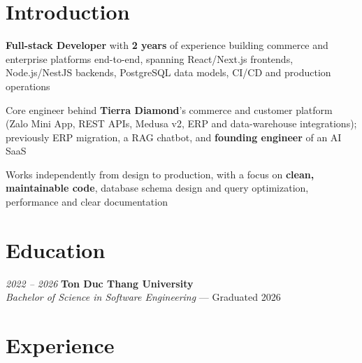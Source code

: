 \section{Introduction}
\begin{onecolentry}
    \begin{highlights}
        \item \textbf{Full-stack Developer} with \textbf{2 years} of experience building commerce and enterprise platforms end-to-end, spanning React/Next.js frontends, Node.js/NestJS backends, PostgreSQL data models, CI/CD and production operations
        \item Core engineer behind \textbf{Tierra Diamond}'s commerce and customer platform (Zalo Mini App, REST APIs, Medusa v2, ERP and data-warehouse integrations); previously ERP migration, a RAG chatbot, and \textbf{founding engineer} of an AI SaaS
        \item Works independently from design to production, with a focus on \textbf{clean, maintainable code}, database schema design and query optimization, performance and clear documentation
    \end{highlights}
\end{onecolentry}


\section{Education}
\begin{twocolentry}{\textit{2022 -- 2026}}
    \textbf{Ton Duc Thang University}\\[4pt]
    \textit{Bachelor of Science in Software Engineering} --- Graduated 2026
\end{twocolentry}


\section{Experience}

